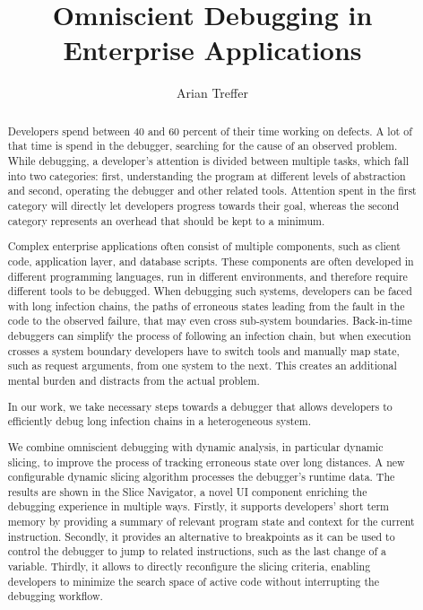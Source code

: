 \documentclass[
			en,
			phd,
			draft,
			garamond,
			12pt,
			]{sty/swathesis}
\author{Arian Treffer}
\title{Omniscient Debugging in Enterprise Applications}
\begin{document}
\frontmatter
\begin{otherlanguage}{german}
\maketitle
\end{otherlanguage}

\linenumbers

\begin{abstract}
Developers spend between 40 and 60 percent of their time working on defects.
A lot of that time is spend in the debugger, searching for the cause of an observed problem.
While debugging, a developer's attention is divided between multiple tasks, which fall into two categories:
first, understanding the program at different levels of abstraction and second, operating the debugger and other related tools.
Attention spent in the first category will directly let developers progress towards their goal, whereas the second category represents an overhead that should be kept to a minimum.

Complex enterprise applications often consist of multiple components, such as client code, application layer, and database scripts.
These components are often developed in different programming languages, run in different environments, and therefore require different tools to be debugged.
When debugging such systems, developers can be faced with long infection chains, the paths of erroneous states leading from the fault in the code to the observed failure, that may even cross sub-system boundaries.
Back-in-time debuggers can simplify the process of following an infection chain,
 but when execution crosses a system boundary developers have to switch tools and manually map state, such as request arguments, from one system to the next.
This creates an additional mental burden and distracts from the actual problem.

In our work, we take necessary steps towards a debugger that allows developers to efficiently debug long infection chains in a heterogeneous system.

We combine omniscient debugging with dynamic analysis, in particular dynamic slicing, 
to improve the process of tracking erroneous state over long distances.
A new configurable dynamic slicing algorithm processes the debugger's runtime data.
The results are shown in the Slice Navigator, a novel UI component enriching the debugging
experience in multiple ways. Firstly, it supports developers’ short term memory
by providing a summary of relevant program state and context for the current
instruction. Secondly, it provides an alternative to breakpoints as it can be used
to control the debugger to jump to related instructions, such as the last change of
a variable. Thirdly, it allows to directly reconfigure the slicing criteria, enabling
developers to minimize the search space of active code without interrupting the
debugging workflow.


\end{abstract}
\end{document}
